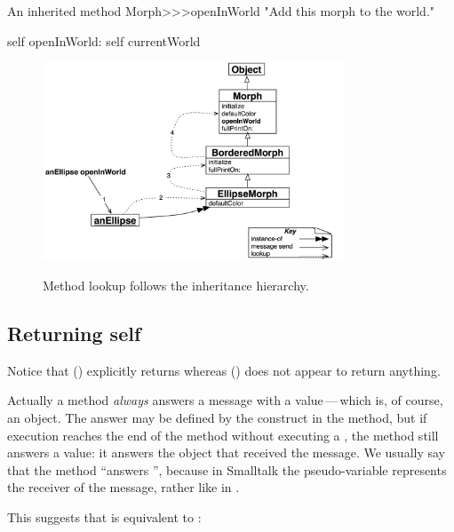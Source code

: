 \documentclass[a4paper,10pt,twoside]{book}
\begin{document}
\begin{method}[openInWorld]{An inherited method}
Morph>>>openInWorld
	"Add this morph to the world."

	self openInWorld: self currentWorld
\end{method}

\begin{figure}[htb]
\begin{center}
	{\includegraphics[width=0.8\textwidth]{openInWorldLookup}}
\caption{Method lookup follows the inheritance hierarchy.}
\end{center}
\end{figure}

\subsection{Returning self}

Notice that  () explicitly returns  whereas  () does not appear to return anything.

Actually a method \emph{always} answers a message with a value\,---\,which is, of course, an object.
The answer may be defined by the \ct{^} construct in the method, but if execution reaches the end of the method without executing a \ct{^}, the method still answers a value: it answers the object that received the message.
We usually say that the method ``answers \self'', because in Smalltalk the pseudo-variable \self represents the receiver of the message, rather like  in .

This suggests that  is equivalent to :
\end{document}
